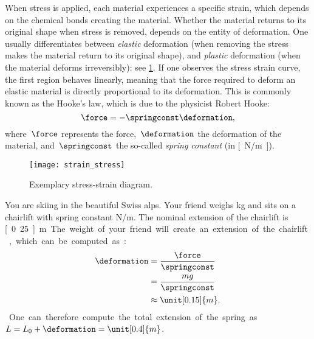     When stress is applied, each material experiences a specific strain, which depends on the chemical bonds creating the material.
    Whether the material returns to its original shape when stress is removed, depends on the entity of deformation.
    One usually differentiates between \emph{elastic} deformation (when removing the stress makes the material return to its original shape), and \emph{plastic} deformation (when the material deforms irreversibly): see \cref{fig:stress_strain}.
    If one observes the stress \vs strain curve, the first region behaves linearly, meaning that the force required to deform an elastic material is directly proportional to its deformation.
    This is commonly known as the Hooke's law, which is due to the physicist Robert Hooke:
    \begin{equation*}
        \force=-\springconst \deformation,
    \end{equation*}
    where~$\force$ represents the force,~$\deformation$ the deformation of the material, and~$\springconst$ the so-called \emph{spring constant} (in \unit[]{[N/m]}).

    \begin{figure}[h]
        \centering
        \texttt{[image: strain\_stress]}
        \caption{Exemplary stress-strain diagram. }
        \label{fig:stress_strain}
    \end{figure}

    \begin{example}
        You are skiing in the beautiful Swiss alps.
        Your friend weighs \unit[100]{kg} and sits on a chairlift with spring constant \unit[4,000]{N/m}.
        The nominal extension of the chairlift is \unit[0.25]{m}.
        The weight of your friend will create an extension of the chairlift, which can be computed as:
        \begin{equation*}
            \begin{aligned}
                \deformation & =\frac{\force}{\springconst} \\
                             & =\frac{mg}{\springconst} \\
                             & \approx \unit[0.15]{m}.
            \end{aligned}
        \end{equation*}
        One can therefore compute the total extension of the spring as~$L=L_0+\deformation=\unit[0.4]{m}$.
    \end{example}

